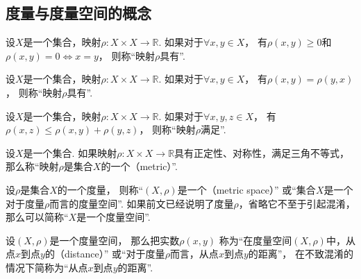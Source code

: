\subsection{度量与度量空间的概念}
\begin{definition}
设\(X\)是一个集合，映射\(\rho\colon X \times X \to \mathbb{R}\).
如果对于\(\forall x,y \in X\)，
有\(\rho(x,y) \geq 0\)和\(\rho(x,y) = 0 \iff x = y\)，
则称“映射\(\rho\)具有”.
\end{definition}
\begin{definition}
设\(X\)是一个集合，映射\(\rho\colon X \times X \to \mathbb{R}\).
如果对于\(\forall x,y \in X\)，
有\(\rho(x,y) = \rho(y,x)\)，
则称“映射\(\rho\)具有”.
\end{definition}
\begin{definition}
设\(X\)是一个集合，映射\(\rho\colon X \times X \to \mathbb{R}\).
如果对于\(\forall x,y,z \in X\)，
有\(\rho(x,z) \leq \rho(x,y) + \rho(y,z)\)，
则称“映射\(\rho\)满足”.
\end{definition}
\begin{definition}
设\(X\)是一个集合.
如果映射\(\rho\colon X \times X\to\mathbb{R}\)具有正定性、对称性，满足三角不等式，
那么称“映射\(\rho\)是集合\(X\)的一个（metric）”.
\end{definition}
\begin{definition}
设\(\rho\)是集合\(X\)的一个度量，
则称“\((X,\rho)\)是一个（metric space）”
或“集合\(X\)是一个{对于度量\(\rho\)而言的度量空间}”.
如果前文已经说明了度量\(\rho\)，省略它不至于引起混淆，那么可以简称“\(X\)是一个度量空间”.
\end{definition}
\begin{definition}
设\((X,\rho)\)是一个度量空间，
那么把实数\(\rho(x,y)\)
称为“在度量空间\((X,\rho)\)中，从点\(x\)到点\(y\)的（distance）”
或“对于度量\(\rho\)而言，从点\(x\)到点\(y\)的距离”，
在不致混淆的情况下简称为“从点\(x\)到点\(y\)的距离”.
\end{definition}


